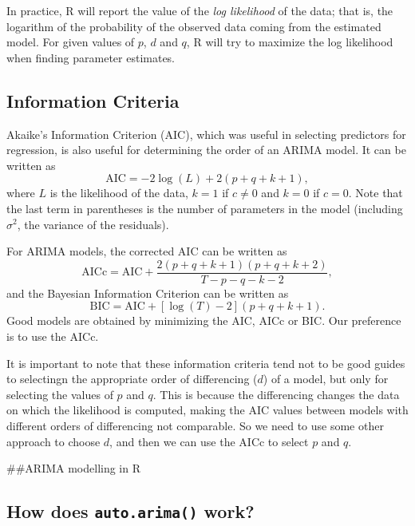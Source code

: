 \documentclass[]{book}
\begin{document}
In practice, R will report the value of the \emph{log likelihood} of the data; that is, the logarithm of the probability of the observed data coming from the estimated model. For given values of \(p\), \(d\) and \(q\), R will try to maximize the log likelihood when finding parameter estimates.

\hypertarget{information-criteria}{%
\subsection*{Information Criteria}\label{information-criteria}}

Akaike's Information Criterion (AIC), which was useful in selecting predictors for regression, is also useful for determining the order of an ARIMA model. It can be written as
\[
  \text{AIC} = -2 \log(L) + 2(p+q+k+1),
\]
where \(L\) is the likelihood of the data, \(k=1\) if \(c\ne0\) and \(k=0\) if \(c=0\). Note that the last term in parentheses is the number of parameters in the model (including \(\sigma^2\), the variance of the residuals).

For ARIMA models, the corrected AIC can be written as
\[
  \text{AICc} = \text{AIC} + \frac{2(p+q+k+1)(p+q+k+2)}{T-p-q-k-2},
\]
and the Bayesian Information Criterion can be written as
\[
  \text{BIC} = \text{AIC} + [\log(T)-2](p+q+k+1).
\]
Good models are obtained by minimizing the AIC, AICc or BIC. Our preference is to use the AICc.

It is important to note that these information criteria tend not to be good guides to selectingn the appropriate order of differencing (\(d\)) of a model, but only for selecting the values of \(p\) and \(q\). This is because the differencing changes the data on which the likelihood is computed, making the AIC values between models with different orders of differencing not comparable. So we need to use some other approach to choose \(d\), and then we can use the AICc to select \(p\) and \(q\).

\#\#ARIMA modelling in R

\hypertarget{how-does-auto.arima-work}{%
\subsection*{\texorpdfstring{How does \texttt{auto.arima()} work?}{How does auto.arima() work?}}\label{how-does-auto.arima-work}}
\end{document}
